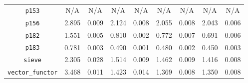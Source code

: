\documentclass[12pt,a4paper,twoside,openright]{report}
\begin{document}
\begin{table}[h]
\begin{tabular}{| c | c c | c c | c c | c c |}
\lstinline!p153!              &                                N/A &    N/A &                                N/A &    N/A &                                N/A &    N/A &                                N/A &    N/A \\
\lstinline!p156!              & \cellcolor[hsb]{0.0,0.913,1}2.895 & 0.009 & \cellcolor[hsb]{0.0,0.536,1}2.124 & 0.008 & \cellcolor[hsb]{0.0,0.503,1}2.055 & 0.008 & \cellcolor[hsb]{0.0,0.497,1}2.043 & 0.006 \\
\lstinline!p182!              & \cellcolor[hsb]{0.0,0.198,1}1.551 & 0.005 & \cellcolor[hsb]{0.3,0.271,1}0.810 & 0.002 & \cellcolor[hsb]{0.3,0.305,1}0.772 & 0.007 & \cellcolor[hsb]{0.3,0.378,1}0.691 & 0.006 \\
\lstinline!p183!              & \cellcolor[hsb]{0.0,0.377,1}0.781 & 0.003 & \cellcolor[hsb]{0.0,0.051,1}0.490 & 0.001 & \cellcolor[hsb]{0.0,0.040,1}0.480 & 0.002 & \cellcolor[hsb]{0.0,0.006,1}0.450 & 0.003 \\
\lstinline!sieve!             & \cellcolor[hsb]{0.3,0.166,1}2.305 & 0.028 & \cellcolor[hsb]{0.3,0.452,1}1.514 & 0.009 & \cellcolor[hsb]{0.3,0.471,1}1.462 & 0.009 & \cellcolor[hsb]{0.3,0.487,1}1.416 & 0.008 \\
\lstinline!vector_functor!    & \cellcolor[hsb]{0.3,0.422,1}3.468 & 0.011 & \cellcolor[hsb]{0.3,0.763,1}1.423 & 0.014 & \cellcolor[hsb]{0.3,0.772,1}1.369 & 0.008 & \cellcolor[hsb]{0.3,0.775,1}1.350 & 0.008 \\
\hline
\end{tabular}


\end{table}
\end{document}

